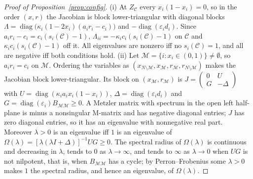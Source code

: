 \documentclass[letterpaper]{article} %
\theoremstyle{definition}
\newcommand{\cC}{\mathcal{C}}
\begin{document}
\begin{proof}[Proof of Proposition~\ref{prop:config}]
(i) At $Z_\cC$ every $x_i(1-x_i)=0$, so in the order $(x,r)$ the Jacobian is block lower-triangular with diagonal blocks $\Lambda=\operatorname{diag}\big(\kappa_i(1-2x_i)(a_ir_i-c_i)\big)$ and $-\operatorname{diag}(\varepsilon_id_i)$. Since $a_ir_i-c_i=c_i(s_i(\cC)-1)$, $\Lambda_{ii}=-\kappa_ic_i(s_i(\cC)-1)$ on $\cC$ and $\kappa_ic_i(s_i(\cC)-1)$ off it. All eigenvalues are nonzero iff no $s_i(\cC)=1$, and all are negative iff both conditions hold. (ii) Let $\mathcal M=\{i:x_i\in(0,1)\}\neq\emptyset$, so $a_ir_i=c_i$ on $\mathcal M$. Ordering the variables as $(x_{N\setminus\mathcal M},x_\mathcal M,r_\mathcal M,r_{N\setminus\mathcal M})$ makes the Jacobian block lower-triangular. Its block on $(x_\mathcal M,r_\mathcal M)$ is $J=\left(\begin{smallmatrix}0&U\\G&-\Delta\end{smallmatrix}\right)$ with $U=\operatorname{diag}(\kappa_ia_ix_i(1-x_i))$, $\Delta=\operatorname{diag}(\varepsilon_id_i)$ and $G=\operatorname{diag}(\varepsilon_i)B_{\mathcal M\mathcal M}\ge0$. A Metzler matrix with spectrum in the open left half-plane is minus a nonsingular M-matrix and has negative diagonal entries; $J$ has zero diagonal entries, so it has an eigenvalue with nonnegative real part. Moreover $\lambda>0$ is an eigenvalue iff $1$ is an eigenvalue of $\Omega(\lambda)=[\lambda(\lambda I+\Delta)]^{-1}UG\ge0$. The spectral radius of $\Omega(\lambda)$ is continuous and decreasing in $\lambda$, tends to $0$ as $\lambda\to\infty$, and tends to $\infty$ as $\lambda\to0$ when $UG$ is not nilpotent, that is, when $B_{\mathcal M\mathcal M}$ has a cycle; by Perron--Frobenius some $\lambda>0$ makes $1$ the spectral radius, and hence an eigenvalue, of $\Omega(\lambda)$.
\end{proof}
\end{document}
